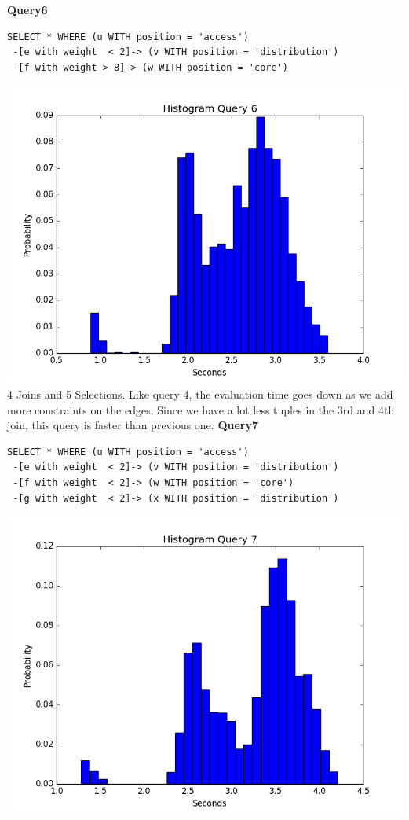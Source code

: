 \documentclass[11pt,singlecolumn]{scrartcl}
\begin{document}
\clearpage
\textbf{Query6}\\
\begin{verbatim}
SELECT * WHERE (u WITH position = 'access')
 -[e with weight  < 2]-> (v WITH position = 'distribution')
 -[f with weight > 8]-> (w WITH position = 'core')\end{verbatim}
\includegraphics[width=1\textwidth]{q6}
4 Joins and 5 Selections. Like query 4, the evaluation time goes down as we add more constraints on the edges. Since we have a lot less tuples in the 3rd and 4th join, this query is faster than previous one.
\clearpage
\textbf{Query7}\\
\begin{verbatim}
SELECT * WHERE (u WITH position = 'access')
 -[e with weight  < 2]-> (v WITH position = 'distribution')
 -[f with weight  < 2]-> (w WITH position = 'core')
 -[g with weight  < 2]-> (x WITH position = 'distribution')\end{verbatim}
\includegraphics[width=1\textwidth]{q71}
\end{document}
